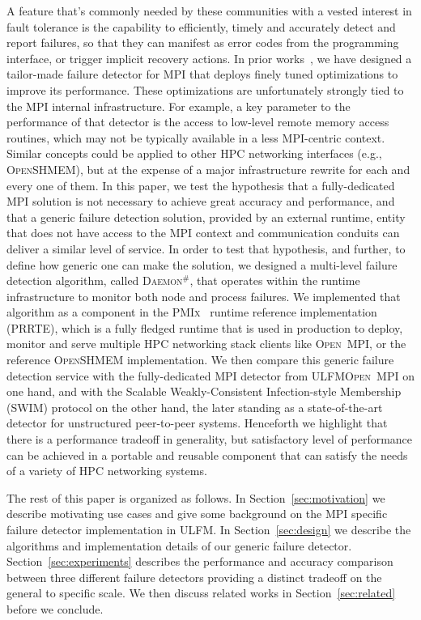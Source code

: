 \documentclass[sigconf]{acmart}
\newcommand{\prrte}[0]{\textsc{PRRTE}\xspace}
\newcommand{\pmix}[0]{\textsc{PMIx}\xspace}
\newcommand{\ompi}[0]{\textsc{Open~MPI}\xspace}
\newcommand{\ulfm}[0]{\textsc{ULFM}\xspace}
\newcommand{\mpi}[0]{\textsc{MPI}\xspace}
\newcommand{\oshmem}[0]{\textsc{OpenSHMEM}\xspace}
\newcommand{\ourwork}[0]{\textsc{Daemon}$^\#$\xspace}
\begin{document}
A feature that's commonly needed by these communities with a vested
interest in fault tolerance is the capability to efficiently, timely and
accurately detect and report failures, so that they can manifest as
error codes from the programming interface, or trigger implicit recovery
actions. In prior works~\cite{George16}, we have designed a tailor-made
failure detector for \mpi that deploys finely tuned optimizations to
improve its performance. These optimizations are unfortunately strongly
tied to the \mpi internal infrastructure. For example, a key parameter to 
the performance of that detector is the
access to low-level remote memory access routines, which may not be typically
available in a less \mpi-centric context. Similar concepts could be
applied to other HPC networking interfaces (e.g., \oshmem), but at 
the expense of a major infrastructure rewrite for each and every one of 
them. In this paper, we test the hypothesis that a fully-dedicated \mpi 
solution is not necessary to achieve great accuracy and performance, and 
that a generic failure detection solution, provided by an external runtime, 
entity that does not have access to the \mpi context and communication conduits
can deliver a similar level of service. In order to test that hypothesis, 
and further, to define how generic one can make the solution, we designed 
a multi-level failure detection algorithm, called \ourwork, that operates
within the runtime infrastructure to monitor both node and process 
failures. We implemented that algorithm as a component in the \pmix~\cite{CASTAIN18} runtime reference implementation (\prrte), which is a fully fledged runtime that is 
used in production to deploy, monitor and 
serve multiple HPC networking stack clients like \ompi, or the 
reference \oshmem implementation. We then compare this generic 
failure detection service with the fully-dedicated \mpi detector from 
\ulfm \ompi on one hand, and with the Scalable Weakly-Consistent Infection-style Membership (SWIM) protocol on the other hand, the later standing
as a state-of-the-art detector for unstructured peer-to-peer systems. Henceforth 
we highlight that there is a performance tradeoff in generality, but 
satisfactory level of performance can be achieved in a portable and reusable 
component that can satisfy the needs of a variety of HPC networking systems. 

The rest of this paper is organized as follows. In Section~\ref{sec:motivation}
we describe motivating use cases and give some background on the \mpi specific 
failure detector implementation in \ulfm. In Section~\ref{sec:design} we describe 
the algorithms and implementation details of our generic failure detector.
Section~\ref{sec:experiments} describes the performance and accuracy comparison
between three different failure detectors providing a distinct tradeoff 
on the general to specific scale. We then discuss related works  in 
Section~\ref{sec:related} before we conclude.
\end{document}
